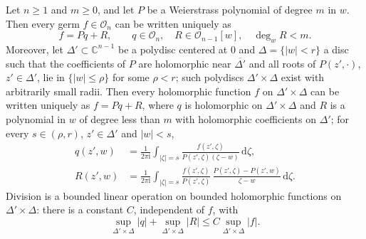 \begin{proposition}\label{prop:weierstrass-division}
Let $n\geq1$ and $m\geq0$, and let $P$ be a Weierstrass polynomial of degree $m$ in $w$. Then every germ $f\in\mathcal O_n$ can be written uniquely as
\[
 f=Pq+R,\qquad q\in\mathcal O_n,\quad
 R\in\mathcal O_{n-1}[w],\quad\deg_w R<m.
\]
Moreover, let $\Delta'\subset\mathbb C^{n-1}$ be a polydisc centered at $0$ and $\Delta=\{|w|<r\}$ a disc such that the coefficients of $P$ are holomorphic near $\overline{\Delta'}$ and all roots of $P(z',\cdot)$, $z'\in\Delta'$, lie in $\{|w|\leq\rho\}$ for some $\rho<r$; such polydiscs $\Delta'\times\Delta$ exist with arbitrarily small radii. Then every holomorphic function $f$ on $\Delta'\times\Delta$ can be written uniquely as $f=Pq+R$, where $q$ is holomorphic on $\Delta'\times\Delta$ and $R$ is a polynomial in $w$ of degree less than $m$ with holomorphic coefficients on $\Delta'$; for every $s\in(\rho,r)$, $z'\in\Delta'$ and $|w|<s$,
\begin{equation}\label{eq:weierstrass-division-integrals}
 \begin{aligned}
 q(z',w)&=\frac1{2\pi\mathrm i}\int_{|\zeta|=s}
       \frac{f(z',\zeta)}{P(z',\zeta)(\zeta-w)}\,\mathrm d\zeta,\\
 R(z',w)&=\frac1{2\pi\mathrm i}\int_{|\zeta|=s}
 \frac{f(z',\zeta)}{P(z',\zeta)}\,
       \frac{P(z',\zeta)-P(z',w)}{\zeta-w}\,\mathrm d\zeta.
 \end{aligned}
\end{equation}
Division is a bounded linear operation on bounded holomorphic functions on $\Delta'\times\Delta$: there is a constant $C$, independent of $f$, with
\[
 \sup_{\Delta'\times\Delta}|q|+\sup_{\Delta'\times\Delta}|R|\le C\sup_{\Delta'\times\Delta}|f|.
\]
\end{proposition}
